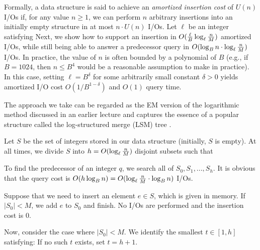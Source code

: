 \vgap

Formally, a data structure is said to achieve an {\em amortized insertion cost} of $U(n)$ I/Os if, for any value $n \ge 1$, we can perform $n$ arbitrary insertions into an initially empty structure in at most $n \cdot U(n)$ I/Os. Let $\ell$ be an integer satisfying
Next, we show how to support an insertion in $O(\frac{\ell}{B} \log_\ell \frac{n}{M})$ amortized I/Os, while still being able to answer a predecessor query in $O(\log_B n \cdot \log_\ell \frac{n}{M})$ I/Os. In practice, the value of $n$ is often bounded by a polynomial of $B$ (e.g., if $B = 1024$, then $n \le B^4$ would be a reasonable assumption to make in practice). In this case, setting $\ell = B^\delta$ for some arbitrarily small constant $\delta > 0$ yields amortized I/O cost $O(1/B^{1-\delta})$ and $O(1)$ query time.

\vgap

The approach we take can be regarded as the EM version of the logarithmic method discussed in an earlier lecture and captures the essence of a popular structure called the log-structured merge (LSM) tree \cite{ocgo96}.

 Let $S$ be the set of integers stored in our data structure (initially, $S$ is empty). At all times, we divide $S$ into $h = O(\log_\ell \frac{n}{M})$ disjoint subsets
such that

 To find the predecessor of an integer $q$, we search all of $S_0, S_1, ..., S_h$. It is obvious that the query cost is $O(h \log_B n) = O(\log_\ell \frac{n}{M} \cdot \log_B n)$ I/Os.

 Suppose that we need to insert an element $e \in S$, which is given in memory. If $|S_0| < M$, we add $e$ to $S_0$ and finish. No I/Os are performed and the insertion cost is 0.

\vgap

Now, consider the case where $|S_0| < M$. We identify the smallest $t \in [1, h]$ satisfying:
If no such $t$ exists, set $t = h+1$.

